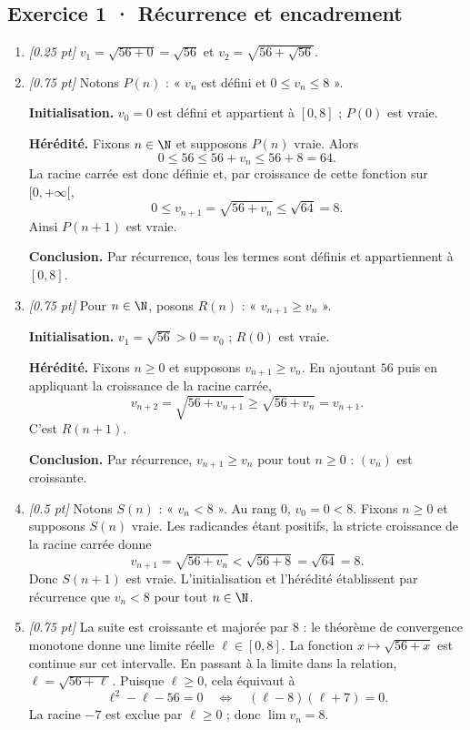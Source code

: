 \subsection*{Exercice 1 · Récurrence et encadrement}\begin{enumerate}

\item \textit{[\num{0,25} pt]} $v_1=\sqrt{56+0}=\sqrt{56}$ et $v_2=\sqrt{56+\sqrt{56}}$.

\item \textit{[\num{0,75} pt]} Notons $P(n)$ : « $v_n$ est défini et $0\le v_n\le 8$ ».
\par\smallskip\textbf{Initialisation.} $v_0=0$ est défini et appartient à $[0,8]$ ; $P(0)$ est vraie.
\par\smallskip\textbf{Hérédité.} Fixons $n\in\N$ et supposons $P(n)$ vraie. Alors
\[0\le 56\le 56+v_n\le 56+8=64.\]
La racine carrée est donc définie et, par croissance de cette fonction sur $[0,+\infty[$,
\[0\le v_{n+1}=\sqrt{56+v_n}\le\sqrt{64}=8.\]
Ainsi $P(n+1)$ est vraie.
\par\smallskip\textbf{Conclusion.} Par récurrence, tous les termes sont définis et appartiennent à $[0,8]$.

\item \textit{[\num{0,75} pt]} Pour $n\in\N$, posons $R(n)$ : « $v_{n+1}\ge v_n$ ».
\par\smallskip\textbf{Initialisation.} $v_1=\sqrt{56}>0=v_0$ ; $R(0)$ est vraie.
\par\smallskip\textbf{Hérédité.} Fixons $n\ge0$ et supposons $v_{n+1}\ge v_n$. En ajoutant $56$ puis en appliquant la croissance de la racine carrée,
\[v_{n+2}=\sqrt{56+v_{n+1}}\ge\sqrt{56+v_n}=v_{n+1}.\]
C'est $R(n+1)$.
\par\smallskip\textbf{Conclusion.} Par récurrence, $v_{n+1}\ge v_n$ pour tout $n\ge0$ : $(v_n)$ est croissante.

\item \textit{[\num{0,5} pt]} Notons $S(n)$ : « $v_n<8$ ». Au rang $0$, $v_0=0<8$.
Fixons $n\ge0$ et supposons $S(n)$ vraie. Les radicandes étant positifs, la stricte croissance de la racine carrée donne
\[v_{n+1}=\sqrt{56+v_n}<\sqrt{56+8}=\sqrt{64}=8.\]
Donc $S(n+1)$ est vraie. L'initialisation et l'hérédité établissent par récurrence que $v_n<8$ pour tout $n\in\N$.

\item \textit{[\num{0,75} pt]} La suite est croissante et majorée par $8$ : le théorème de convergence monotone donne une limite réelle $\ell\in[0,8]$.
La fonction $x\mapsto\sqrt{56+x}$ est continue sur cet intervalle. En passant à la limite dans la relation, $\ell=\sqrt{56+\ell}$. Puisque $\ell\ge0$, cela équivaut à
\[\ell^2-\ell-56=0\quad\Longleftrightarrow\quad(\ell-8)(\ell+7)=0.\]
La racine $-7$ est exclue par $\ell\ge0$ ; donc $\lim v_n=8$.


\end{enumerate}
